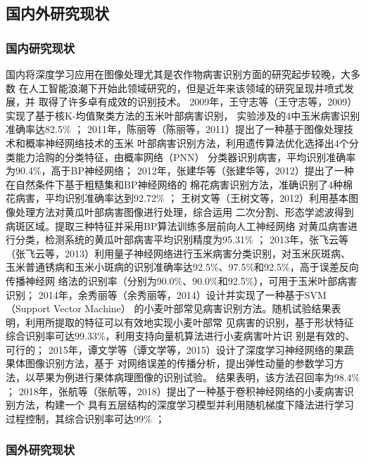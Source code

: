 \subsection{\textbf{国内外研究现状}}
\subsubsection{\textbf{国内研究现状}}
国内将深度学习应用在图像处理尤其是农作物病害识别方面的研究起步较晚，大多数
在人工智能浪潮下开始此领域研究的，但是近年来该领域的研究呈现井喷式发展，并
取得了许多卓有成效的识别技术。
2009年，王守志等（王守志等，2009）实现了基于核K-均值聚类方法的玉米叶部病害识别，
实验涉及的4中玉米病害识别准确率达82.5\% \cite{王守志2009基于核}；
2011年，陈丽等（陈丽等，2011）提出了一种基于图像处理技术和概率神经网络技术的玉米
叶部病害识别方法，利用遗传算法优化选择出4个分类能力洽购的分类特征，由概率网络（PNN）
分类器识别病害，平均识别准确率为90.4\%，高于BP神经网络\cite{陈丽2011概率神经网络在玉米叶部病害识别中的应用}；
2012年，张建华等（张建华等，2012）提出了一种在自然条件下基于粗糙集和BP神经网络的
棉花病害识别方法，准确识别了4种棉花病害，平均识别准确率达到92.72\% \cite{张建华2012基于粗糙集和}；
王树文等（王树文等，2012）利用基本图像处理方法对黄瓜叶部病害图像进行处理，综合运用
二次分割、形态学滤波得到病斑区域。提取三种特征并采用BP算法训练多层前向人工神经网络
对黄瓜病害进行分类，检测系统的黄瓜叶部病害平均识别精度为95.31\% \cite{王树文2012基于图像处理技术的黄瓜叶片病害识别诊断系统研究}；
2013年，张飞云等（张飞云等，2013）利用量子神经网络进行玉米病害分类识别，对玉米灰斑病、
玉米普通锈病和玉米小斑病的识别准确率达92.5\%、97.5\%和92.5\%，高于误差反向传播神经网
络法的识别率（分别为90.0\%、90.0\%和92.5\%），可用于玉米叶部病害识别\cite{张飞云2013基于量子神经网络和组合特征参数的玉米叶部病害识别}；
2014年，余秀丽等（余秀丽等，2014）设计并实现了一种基于SVM（Support Vector Machine）
的小麦叶部常见病害识别方法。随机试验结果表明，利用所提取的特征可以有效地实现小麦叶部常
见病害的识别，基于形状特征综合识别率可达99.33\%，利用支持向量机算法进行小麦病害叶片识
别是有效的、可行的\cite{余秀丽2014基于}；
2015年，谭文学等（谭文学等，2015）设计了深度学习神经网络的果蔬果体图像识别方法，基于
对网络误差的传播分析，提出弹性动量的参数学习方法，以苹果为例进行果体病理图像的识别试验。
结果表明，该方法召回率为98.4\% \cite{谭文学2015基于弹性动量深度学习神经网络的果体病理图像识别}；
2018年，张航等（张航等，2018）提出了一种基于卷积神经网络的小麦病害识别方法，构建一个
具有五层结构的深度学习模型并利用随机梯度下降法进行学习过程控制，其综合识别率可达99\% \cite{张航2018一种基于卷积神经网络的小麦病害识别方法}；


\subsubsection{\textbf{国外研究现状}}

